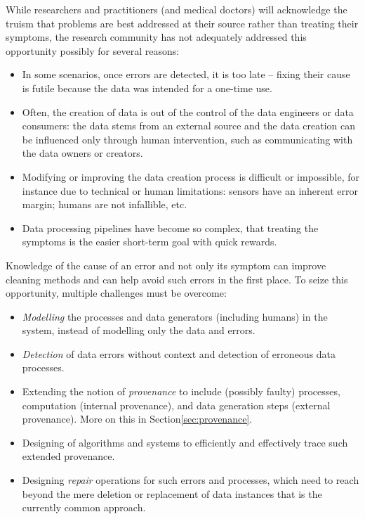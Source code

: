 \documentclass[11pt]{article}
\begin{document}
While researchers and practitioners (and medical doctors) will acknowledge the truism that problems are best addressed at their source rather than treating their symptoms, the research community has not adequately addressed this opportunity possibly for several reasons:
\begin{itemize}
    \item In some scenarios, once errors are detected, it is too late -- fixing their cause is futile because the data was intended for a one-time use.
    \item Often, the creation of data is out of the control of the data engineers or data consumers: the data stems from an external source and the data creation can be influenced only through human intervention, such as communicating with the data owners or creators.
    \item Modifying or improving the data creation process is difficult or impossible, for instance due to technical or human limitations: sensors have an inherent error margin; humans are not infallible, etc.
    \item Data processing pipelines have become so complex, that treating the symptoms is the easier short-term goal with quick rewards.
\end{itemize}

Knowledge of the cause of an error and not only its symptom can improve cleaning methods and can help avoid such errors in the first place. To seize this opportunity, multiple challenges must be overcome:
\begin{itemize}
    \item \emph{Modelling} the processes and data generators (including humans) in the system, instead of modelling only the data and errors.

    \item \emph{Detection} of data errors without context and detection of erroneous data processes.
    
    \item Extending the notion of \emph{provenance} to include (possibly faulty) processes, computation (internal provenance), and data generation steps (external provenance). More on this in Section\ref{sec:provenance}.
    
    \item Designing of algorithms and systems to efficiently and effectively trace such extended provenance.
    
    \item Designing \emph{repair} operations for such errors and processes, which need to reach beyond the mere deletion or replacement of data instances that is the currently common approach.

\end{itemize}
\end{document}
